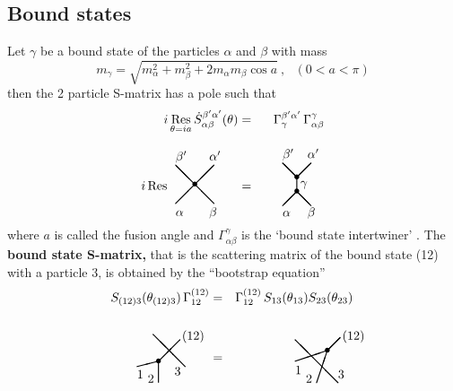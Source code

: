 \documentclass[a4paper,12pt]{article}
\def\limfunc#1{\mathop{\rm #1}}%
\begin{document}
\subsection*{Bound states}

Let $\gamma $ be a bound state of the particles $\alpha $ and $\beta $ with
mass 
\[
m_{\gamma }=\sqrt{m_{\alpha }^{2}+m_{\beta }^{2}+2m_{\alpha }m_{\beta }\cos a%
}~,~~~(0<a<\pi ) 
\]
then the 2 particle S-matrix has a pole such that 
\begin{eqnarray*}
i\limfunc{Res}_{\theta =ia}\dot{S}_{\alpha \beta }^{\beta ^{\prime }\alpha
^{\prime }}(\theta ) &=&\Gamma _{\gamma }^{\beta ^{\prime }\alpha ^{\prime
}}\,\Gamma _{\alpha \beta }^{\gamma } \\[5mm]
i\limfunc{Res} 
\begin{array}{c}
\unitlength2.7mm\begin{picture}(5,6) \thicklines \put(0,1){\line(1,1){4}}
\put(2,3){\makebox(0,0){$\bullet$}} \put(4,1){\line(-1,1){4}}
\put(0,-.3){$\alpha$} \put(3.5,-.3){$\beta$} \put(3.5,5.5){$\alpha'$}
\put(0,5.5){$\beta'$} \end{picture}
\end{array}
~~ &=&~~~ 
\begin{array}{c}
\unitlength2mm\begin{picture}(5,8) \thicklines \put(0,1){\line(1,1){2}}
\put(2,3){\makebox(0,0){$\bullet$}} \put(4,1){\line(-1,1){2}}
\put(2,3){\line(0,1){2}} \put(2,5){\makebox(0,0){$\bullet$}}
\put(2,5){\line(1,1){2}} \put(2,5){\line(-1,1){2}} \put(0,-.5){$\alpha$}
\put(3.5,-.5){$\beta$} \put(2.5,3.7){$\gamma$} \put(3.5,7.7){$\alpha'$}
\put(0,7.7){$\beta'$} \end{picture}
\end{array}
\end{eqnarray*}
where $a$ is called the fusion angle and $\Gamma _{\alpha \beta }^{\gamma }$
is the `bound state intertwiner' \cite{K1,BK}. The \textbf{bound state
S-matrix, }that is the scattering matrix of the bound state (12) with a
particle 3, is obtained by the ``bootstrap equation'' \cite{K1} 
\begin{eqnarray*}
S_{(12)3}(\theta _{(12)3})\,\Gamma _{12}^{(12)} &=&\Gamma
_{12}^{(12)}\,S_{13}(\theta _{13})S_{23}(\theta _{23})\, \\[5mm]
\begin{array}{c}
\unitlength3mm\begin{picture}(5,5) \thicklines\put(2,2){\line(1,1){2}}
\put(4.5,1.5){\line(-1,1){3}} \put(2,2){\line(-4,-1){2}}
\put(2,0){\line(0,1){2}} \put(0,.4){$1$} \put(1,0){$2$} \put(3.5,.7){$3$}
\put(4.2,4){$(12)$} \put(2,2){\makebox(0,0){$\bullet$}} \end{picture}
\end{array}
~~~ &=&~~~ 
\begin{array}{c}
\unitlength3mm\begin{picture}(5,5) \thicklines \put(3,3){\line(1,1){1.2}}
\put(4,0){\line(-1,1){4}} \put(0,2){\line(3,1){3}} \put(2,0){\line(1,3){1}}
\put(0,.8){$1$} \put(1,0){$2$} \put(4,.4){$3$} \put(4.4,4){$(12)$}
\put(3,3){\makebox(0,0){$\bullet$}} \end{picture}
\end{array}
\end{eqnarray*}
\end{document}
